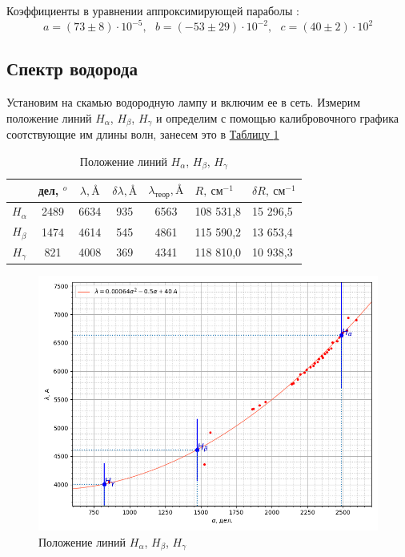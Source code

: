 \documentclass{article}
\begin{document}
Коэффициенты в уравнении аппроксимирующей параболы :
\begin{equation*}
    a = (73 \pm 8)\cdot 10^{-5}, ~~~ b = (-53 \pm 29)\cdot 10^{-2}, ~~~c = (40 \pm 2)\cdot 10^2
\end{equation*}

\subsection{Спектр водорода}
Установим на скамью водородную лампу и включим ее в сеть. Измерим положение линий $H_{\alpha}$, $H_{\beta}$, $H_{\gamma}$ и определим с помощью калибровочного графика соотствующие им длины волн, занесем это в  \hyperref[tab:1]{Таблицу \ref*{tab:1}}


\begin{table}[h!]
    \begin{center}
    \begin{tabular}{|c|c|c|c|c|l|l|} \hline  
 & дел, $^o$& $\lambda, \text{\AA}$& $\delta \lambda, \text{\AA}$ &$\lambda_{теор}, \text{\AA}$ & $R,  ~см^{-1}$&$\delta R, ~см^{-1}$\\ \hline  
         $H_{\alpha}$&  2489&  6634&  935 &6563 & 108 531,8&15 296,5\\ \hline  
         $H_\beta$&  1474&  4614&  545 &4861 & 115 590,2&13 653,4\\ \hline  
         $H_{\gamma}$&  821&  4008&  369 &4341 & 118 810,0&10 938,3\\ \hline 
    \end{tabular}
    \caption{Положение линий $H_{\alpha}$, $H_{\beta}$, $H_{\gamma}$}
    \label{tab:1}
    \end{center}
\end{table}
\newpage
\begin{figure}[h!]
    \centering
    \includegraphics[scale = 0.75]{Figure_2.png}
    \caption{Положение линий $H_{\alpha}$, $H_{\beta}$, $H_{\gamma}$}
    \label{fig:Halpha}
\end{figure}
\end{document}
